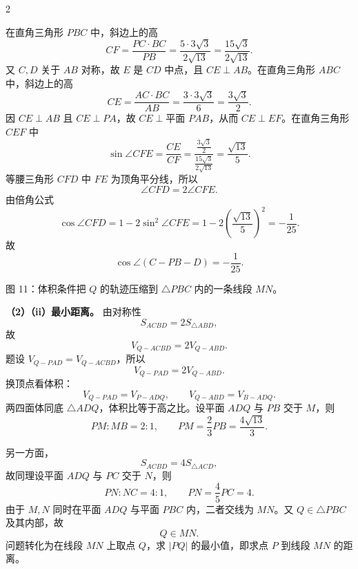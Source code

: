 \documentclass[UTF8,zihao=-4]{ctexart}
\begin{document}
\begin{paracol}{2}
{在直角三角形 \(PBC\) 中，斜边上的高
\[
CF=\frac{PC\cdot BC}{PB}
=\frac{5\cdot3\sqrt3}{2\sqrt{13}}
=\frac{15\sqrt3}{2\sqrt{13}}.
\]
又 \(C,D\) 关于 \(AB\) 对称，故 \(E\) 是 \(CD\) 中点，且 \(CE\perp AB\)。在直角三角形 \(ABC\) 中，斜边上的高
\[
CE=\frac{AC\cdot BC}{AB}
=\frac{3\cdot3\sqrt3}{6}
=\frac{3\sqrt3}{2}.
\]
因 \(CE\perp AB\) 且 \(CE\perp PA\)，故 \(CE\perp\text{平面 }PAB\)，从而 \(CE\perp EF\)。在直角三角形 \(CEF\) 中
\[
\sin\angle CFE=\frac{CE}{CF}
=\frac{\frac{3\sqrt3}{2}}{\frac{15\sqrt3}{2\sqrt{13}}}
=\frac{\sqrt{13}}5.
\]
等腰三角形 \(CFD\) 中 \(FE\) 为顶角平分线，所以
\[
\angle CFD=2\angle CFE.
\]
由倍角公式
\[
\cos\angle CFD=1-2\sin^2\angle CFE
=1-2\left(\frac{\sqrt{13}}5\right)^2
=-\frac1{25}.
\]
故
\[
\boxed{\cos\angle(C-PB-D)=-\frac1{25}}.
\]

\begin{center}

{\small 图 11：体积条件把 \(Q\) 的轨迹压缩到 \(\triangle PBC\) 内的一条线段 \(MN\)。}
\end{center}

\textbf{（2）（ii）最小距离。} 由对称性
\[
S_{ACBD}=2S_{\triangle ABD},
\]
故
\[
V_{Q-ACBD}=2V_{Q-ABD}.
\]
题设 \(V_{Q-PAD}=V_{Q-ACBD}\)，所以
\[
V_{Q-PAD}=2V_{Q-ABD}.
\]
换顶点看体积：
\[
V_{Q-PAD}=V_{P-ADQ},\qquad V_{Q-ABD}=V_{B-ADQ}.
\]
两四面体同底 \(\triangle ADQ\)，体积比等于高之比。设平面 \(ADQ\) 与 \(PB\) 交于 \(M\)，则
\[
PM:MB=2:1,\qquad PM=\frac23PB=\frac{4\sqrt{13}}3.
\]

另一方面，
\[
S_{ACBD}=4S_{\triangle ACD},
\]
故同理设平面 \(ADQ\) 与 \(PC\) 交于 \(N\)，则
\[
PN:NC=4:1,\qquad PN=\frac45PC=4.
\]
由于 \(M,N\) 同时在平面 \(ADQ\) 与平面 \(PBC\) 内，二者交线为 \(MN\)。又 \(Q\in \triangle PBC\) 及其内部，故
\[
Q\in MN.
\]
问题转化为在线段 \(MN\) 上取点 \(Q\)，求 \(|PQ|\) 的最小值，即求点 \(P\) 到线段 \(MN\) 的距离。

}
\end{paracol}
\end{document}
